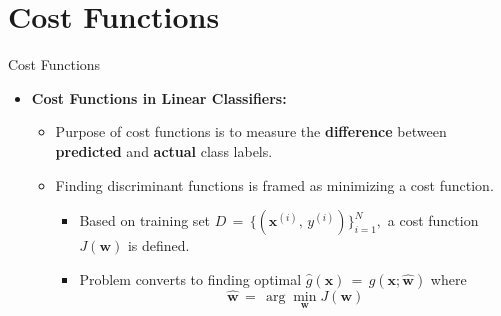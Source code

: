 \documentclass[serif, aspectratio=169]{beamer}
\begin{document}
\section{Cost Functions}
\begin{frame}{Cost Functions}
    \begin{itemize}
        \item \textbf{Cost Functions in Linear Classifiers:}
        \medskip
        \begin{itemize}\itemsep1em
            \item Purpose of cost functions is to measure the \textbf{difference} between \textbf{predicted} and \textbf{actual} class labels.
            \item Finding discriminant functions is framed as minimizing a cost function.
            \smallskip
            \begin{itemize}\itemsep0.8em
                \item Based on training set \(D \, = \, \{(\mathbf{x}^{(i)},\, y^{(i)})\}^N_{i=1},\) a cost function \(J(\mathbf{w})\) is defined.
                \item Problem converts to finding optimal \(\hat{g}(\mathbf{x}) \, = \, g(\mathbf{x; \hat{w}})\) where \[\mathbf{\hat{w}} \, = \, \arg \min_{\mathbf{w}}J(\mathbf{w})\]
            \end{itemize}
        \end{itemize}
    \end{itemize}
\end{frame}
\end{document}
